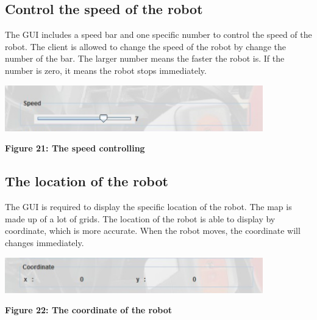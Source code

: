 \documentclass[11pt, a4paper]{report}
\begin{document}
\subsection{Control the speed of the robot}
The GUI includes a speed bar and one specific number to control the speed of the robot. The client is allowed to change the speed of the robot by change the number of the bar. The larger number means the faster the robot is. If the number is zero, it means the robot stops immediately.
  \begin{center}
 \includegraphics[width=11.20cm]{bar}
\end{center}
\begin{center}
\textbf {Figure 21: The speed controlling} \\[0.3cm]
\end{center}
\subsection{The location of the robot}
The GUI is required to display the specific location of the robot. The map is made up of a lot of grids. The location of the robot is able to display by coordinate, which is more accurate. When the robot moves, the coordinate will changes immediately.
   \begin{center}
 \includegraphics[width=11.20cm]{coordinate}
\end{center}
\begin{center}
\textbf {Figure 22: The coordinate of the robot} \\[0.3cm]
\end{center}


\end{document}
